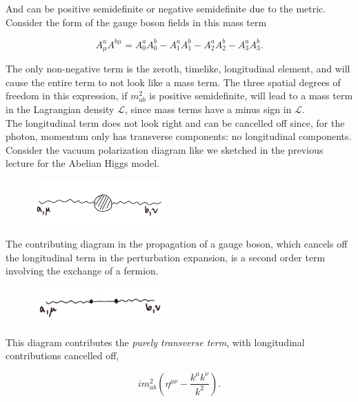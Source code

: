 \documentclass[10pt]{article}
\begin{document}
\noindent And can be positive semidefinite or negative semidefinite due to the metric. Consider the form of the gauge boson fields in this mass term

\begin{equation}
A_\mu^a A^{b \mu} = A^a_0 A^b_0 - A_1^a A_1^b - A_2^a A_2^b - A_3^a A_3^b   .
\end{equation}

\noindent The only non-negative term is the zeroth, timelike, longitudinal element, and will cause the entire term to not look like a mass term. The three spatial degrees of freedom in this expression, if $m^2_{ab}$ is positive semidefinite, will lead to a mass term in the Lagrangian density $\mathcal{L}$, since mass terms have a minus sign in $\mathcal{L}$. \\

\noindent The longitudinal term does not look right and can be cancelled off since, for the photon, momentum only has transverse components: no longitudinal components. Consider the vacuum polarization diagram like we sketched in the previous lecture for the Abelian Higgs model.

\begin{figure}[H]
	\centering
	\includegraphics[width=2in]{images/gauge_boson_poles.png}
\end{figure} 

\noindent The contributing diagram in the propagation of a gauge boson, which cancels off the longitudinal term in the perturbation expansion, is a second order term involving the exchange of a fermion.

\begin{figure}[H]
	\centering
	\includegraphics[width=2in]{images/gauge_boson_cancel.png}
\end{figure} 

\noindent This diagram contributes the \textit{purely transverse term}, with longitudinal contributions cancelled off,

\begin{equation}
i m_{ab}^2 \left( \eta^{\mu\nu} - \frac{k^\mu k^\nu}{k^2} \right).
\end{equation}
\end{document}
